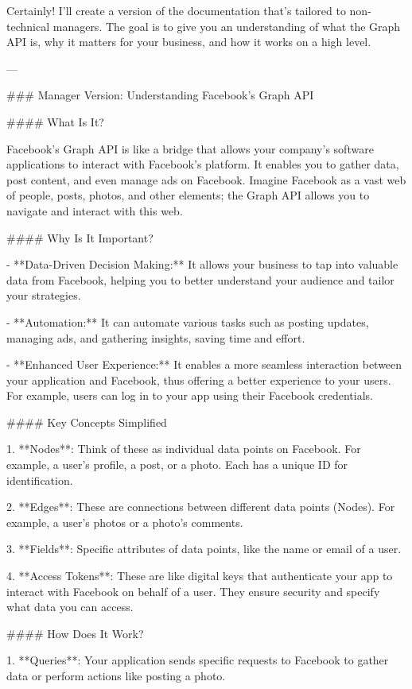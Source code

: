 Certainly! I'll create a version of the documentation that's tailored to non-technical managers. The goal is to give you an understanding of what the Graph API is, why it matters for your business, and how it works on a high level.

---

### Manager Version: Understanding Facebook's Graph API

#### What Is It?

Facebook's Graph API is like a bridge that allows your company's software applications to interact with Facebook's platform. It enables you to gather data, post content, and even manage ads on Facebook. Imagine Facebook as a vast web of people, posts, photos, and other elements; the Graph API allows you to navigate and interact with this web.

#### Why Is It Important?

- **Data-Driven Decision Making:** It allows your business to tap into valuable data from Facebook, helping you to better understand your audience and tailor your strategies.
  
- **Automation:** It can automate various tasks such as posting updates, managing ads, and gathering insights, saving time and effort.

- **Enhanced User Experience:** It enables a more seamless interaction between your application and Facebook, thus offering a better experience to your users. For example, users can log in to your app using their Facebook credentials.

#### Key Concepts Simplified

1. **Nodes**: Think of these as individual data points on Facebook. For example, a user's profile, a post, or a photo. Each has a unique ID for identification.

2. **Edges**: These are connections between different data points (Nodes). For example, a user's photos or a photo's comments.

3. **Fields**: Specific attributes of data points, like the name or email of a user.

4. **Access Tokens**: These are like digital keys that authenticate your app to interact with Facebook on behalf of a user. They ensure security and specify what data you can access.

#### How Does It Work?

1. **Queries**: Your application sends specific requests to Facebook to gather data or perform actions like posting a photo.
  
